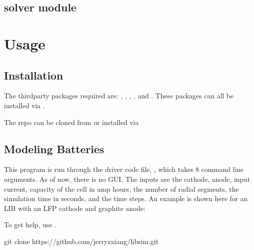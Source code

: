 \documentclass[letterpaper,10pt,english]{sphinxmanual}
\begin{document}
\section{solver module}
\label{\detokenize{solver:solver-module}}\label{\detokenize{solver::doc}}

\chapter{Usage}
\label{\detokenize{usage:usage}}\label{\detokenize{usage::doc}}

\section{Installation}
\label{\detokenize{usage:installation}}\label{\detokenize{usage:id1}}
\sphinxAtStartPar
The third\sphinxhyphen{}party packages required are: , , ,
, and . These packages can all be installed via .

\sphinxAtStartPar
The repo can be cloned from  or
installed via

\sphinxAtStartPar
{}


\section{Modeling Batteries}
\label{\detokenize{usage:modeling-batteries}}
\sphinxAtStartPar
This program is run through the driver code file, , which takes 8
command line arguments. As of now, there is no GUI. The inputs are the cathode,
anode, input current, capacity of the cell in amp hours, the number of radial
segments, the simulation time in seconds, and the time steps. An example is
shown here for an LIB with an LFP cathode and graphite anode:

\sphinxAtStartPar
{}

\sphinxAtStartPar
To get help, use .

\begin{sphinxVerbatim}[commandchars=\\\{\}]
git clone https://github.com/jerryzxiang/libsim.git
\end{sphinxVerbatim}
\end{document}
